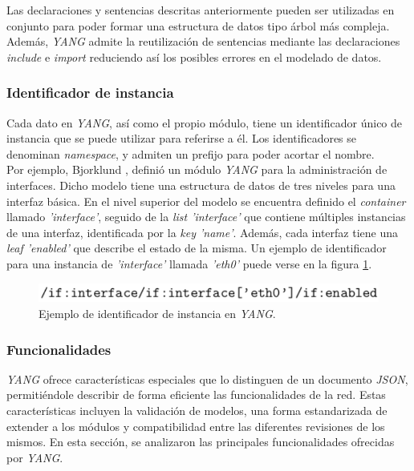 Las declaraciones y sentencias descritas anteriormente pueden ser utilizadas en conjunto para poder formar una estructura de datos tipo árbol más compleja.
Además, \textit{YANG} admite la reutilización de sentencias mediante las declaraciones \textit{include} e \textit{import} reduciendo así los posibles errores en el modelado de datos.

\subsubsection{Identificador de instancia }
Cada dato en \textit{YANG}, así como el propio módulo, tiene un identificador único de instancia que se puede utilizar para referirse a él. Los identificadores se denominan \textit{namespace}, y admiten un prefijo para poder acortar el nombre. 
\\

Por ejemplo, Bjorklund \parencite{yangsystem}, definió un módulo \textit{YANG} para la administración de interfaces. Dicho modelo tiene una estructura de datos de tres niveles para una interfaz básica. En el nivel superior del modelo se encuentra definido el \textit{container} llamado \textit{'interface'}, seguido de la \textit{list 'interface'} que contiene múltiples instancias de una interfaz, identificada por la \textit{key 'name'}. Además, cada interfaz tiene una \textit{leaf 'enabled'} que describe el estado de la misma. Un ejemplo de identificador para una instancia de \textit{'interface'} llamada \textit{'eth0'} puede verse en la figura \ref{fig:interfaceyang}.

\begin{figure}[htbp]
	\centering
	\includegraphics[scale=0.9]{Figures/interface-yang.pdf}
	\caption{Ejemplo de identificador de instancia en \textit{YANG}.}
	\label{fig:interfaceyang}
  \end{figure}

  \subsubsection{Funcionalidades}
  \textit{YANG} ofrece características especiales que lo distinguen de un documento \textit{JSON}, permitiéndole describir de forma eficiente las funcionalidades de la red. Estas características incluyen la validación de modelos, una forma estandarizada de extender a los módulos y compatibilidad entre las diferentes revisiones de los mismos. En esta sección, se analizaron las principales funcionalidades ofrecidas por \textit{YANG}.

